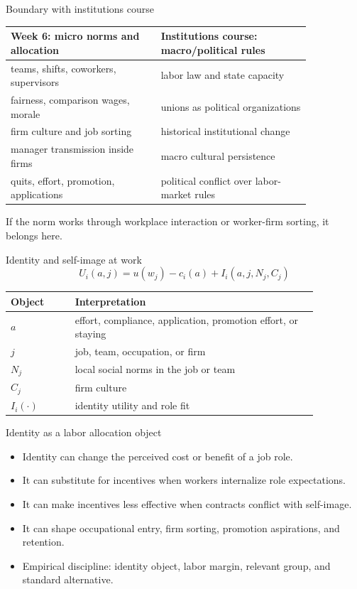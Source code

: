 \documentclass[aspectratio=169,11pt]{beamer}
\begin{document}
\begin{frame}{Boundary with institutions course}
\small
\begin{tabular}{p{0.42\linewidth} p{0.42\linewidth}}
\toprule
Week 6: micro norms and allocation & Institutions course: macro/political rules \\
\midrule
teams, shifts, coworkers, supervisors & labor law and state capacity \\
fairness, comparison wages, morale & unions as political organizations \\
firm culture and job sorting & historical institutional change \\
manager transmission inside firms & macro cultural persistence \\
quits, effort, promotion, applications & political conflict over labor-market rules \\
\bottomrule
\end{tabular}

\vspace{0.7em}
If the norm works through workplace interaction or worker-firm sorting, it belongs here.
\end{frame}

\begin{frame}{Identity and self-image at work}
\[
U_i(a,j) = u\!\left(w_j\right) - c_i(a)
  + I_i\!\left(a, j, N_j, C_j\right)
\]

\small
\begin{tabular}{p{0.18\linewidth} p{0.68\linewidth}}
\toprule
Object & Interpretation \\
\midrule
$a$ & effort, compliance, application, promotion effort, or staying \\
$j$ & job, team, occupation, or firm \\
$N_j$ & local social norms in the job or team \\
$C_j$ & firm culture \\
$I_i(\cdot)$ & identity utility and role fit \\
\bottomrule
\end{tabular}
\end{frame}

\begin{frame}{Identity as a labor allocation object}
\begin{itemize}
    \item Identity can change the perceived cost or benefit of a job role.
    \item It can substitute for incentives when workers internalize role expectations.
    \item It can make incentives less effective when contracts conflict with self-image.
    \item It can shape occupational entry, firm sorting, promotion aspirations, and retention.
    \item Empirical discipline: identity object, labor margin, relevant group, and standard alternative.
\end{itemize}
\end{frame}
\end{document}
